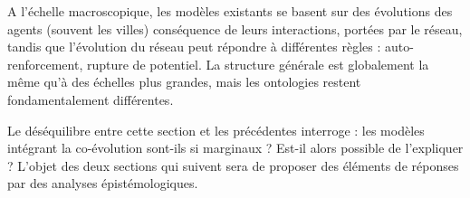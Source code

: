 A l'échelle macroscopique, les modèles existants se basent sur des évolutions des agents (souvent les villes) conséquence de leurs interactions, portées par le réseau, tandis que l'évolution du réseau peut répondre à différentes règles : auto-renforcement, rupture de potentiel. La structure générale est globalement la même qu'à des échelles plus grandes, mais les ontologies restent fondamentalement différentes.



Le déséquilibre entre cette section et les précédentes interroge : les modèles intégrant la co-évolution sont-ils si marginaux ? Est-il alors possible de l'expliquer ? L'objet des deux sections qui suivent sera de proposer des éléments de réponses par des analyses épistémologiques.





\stars








